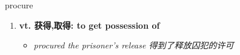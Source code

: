 
\begin{frame}
{\huge procure}
\begin{center}
\begin{enumerate}\Large
  \item \textbf{vt. 获得,取得: to get possession of}
  \begin{itemize}
    \item \em{\Large{procured the prisoner's release 得到了释放囚犯的许可}}
  \end{itemize}
\end{enumerate}
\end{center}
\end{frame}
